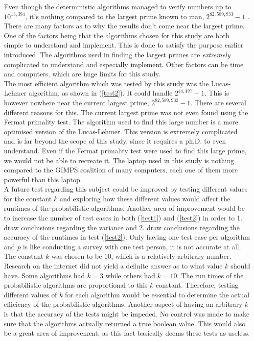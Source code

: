 \documentclass[main.tex]{subfiles}
\begin{document}
Even though the deterministic algorithms managed to verify numbers up to
$10^{13,394}$, it's nothing compared to the largest prime known to man,
$2^{82,589,933} - 1$ \cite{prime:largest_digits}. There are many factors as to
why the results don't come near the largest prime. One of the factors being that
the algorithms chosen for this study are both simple to understand and
implement. This is done to satisfy the purpose earlier introduced. The
algorithms used in finding the largest primes are \emph{extremely} complicated
to understand and especially implement. Other factors can be time and computers, which are huge limits for this study. \\

The most efficient algorithm which was tested by this study was the Lucas-Lehmer
algorithm, as shown in (\ref{test2}). It could handle $2^{44,497}-1$. This is
however nowhere near the current largest prime, $2^{82,589,933}-1$. There are
several different reasons for this. The current largest prime was not even found
using the Fermat primality test. The algorithm used to find this large number is
a more optimised version of the Lucas-Lehmer. This version is extremely
complicated and is far beyond the scope of this study, since it requires a ph.D.
to even understand. Even if the Fermat primality test were used to find this
large prime, we would not be able to recreate it. The laptop used in this study
is nothing compared to the GIMPS coalition of many computers, each
one of them more powerful than this laptop. \\

A future test regarding this subject could be improved by testing different
values for the constant $k$ and exploring how these different values would
affect the runtimes of the probabilistic algorithms. Another area of improvement
would be to increase the number of test cases in both (\ref{test1}) and
(\ref{test2}) in order to 1. draw conclusions regarding the variance and 2. draw
conclusions regarding the accuracy of the runtimes in test (\ref{test2}). Only
having one test case per algorithm and $p$ is like conducting a survey with one
test person, it is not accurate at all. \\

The constant $k$ was chosen to be $10$, which is a relatively arbitrary number.
Research on the internet did not yield a definite answer as to what value $k$
should have. Some algorithms had $k = 3$ while others had $k = 10$. The run
times of the probabilistic algorithms are proportional to this $k$ constant.
Therefore, testing different values of $k$ for each algorithm would be essential
to determine the actual efficiency of the probabilistic algorithms. Another
aspect of having an arbitrary $k$ is that the accuracy of the tests might be
impeded. No control was made to make sure that the algorithms actually returned
a true boolean value. This would also be a great area of improvement, as this
fact basically deems these tests as useless. \\
\end{document}
